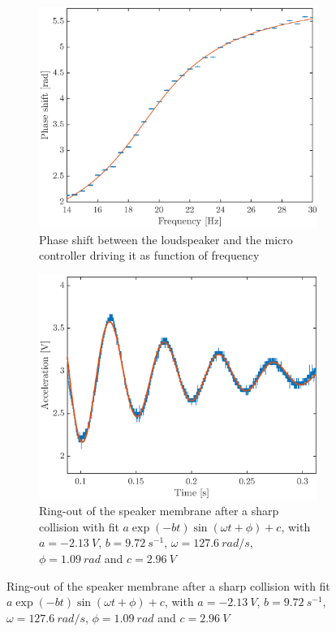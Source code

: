 \documentclass[12pt,oneside,a4paper]{article}
\numberwithin{equation}{section}
\begin{document}
{{{{\begin{figure}[h]
\begin{subfigure}[t]{0.49\textwidth}
		\includegraphics[width=\textwidth]{pshiftplot.eps} 
		\caption{Phase shift between the loudspeaker and the micro controller driving it as function of frequency}
		\label{phaseshift_plot}
	\end{subfigure} \hfill 
	\begin{subfigure}[t]{0.49\textwidth}
		\centering
		\includegraphics[width=\textwidth]{ringout.eps}
		\caption{Ring-out of the speaker membrane after a sharp collision with fit $a\exp(-bt)\sin(\omega t + \phi)+c$, with $a=\SI{-2.13}{V}$, $b=\SI{9.72}{s^{-1}}$, $\omega=\SI{127.6}{rad/s}$, $\phi=\SI{1.09}{rad}$ and $c=\SI{2.96}{V}$}
		\label{ringout}
	\end{subfigure}
\end{figure}

}}}}
\end{document}
